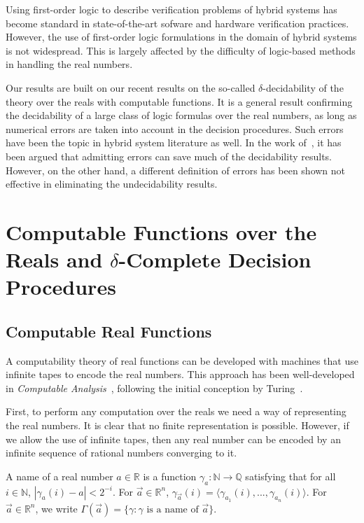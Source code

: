 \documentclass[envcountsect]{llncs}
\begin{document}
Using first-order logic to describe verification problems of hybrid systems has become standard in state-of-the-art sofware and hardware verification practices. However, the use of first-order logic formulations in the domain of hybrid systems is not widespread. This is largely affected by the difficulty of logic-based methods in handling the real numbers. 

Our results are built on our recent results on the so-called $\delta$-decidability of the theory over the reals with computable functions. It is a general result confirming the decidability of a large class of logic formulas over the real numbers, as long as numerical errors are taken into account in the decision procedures. Such errors have been the topic in hybrid system literature as well. In the work of~\cite{}, it has been argued that admitting errors can save much of the decidability results. However, on the other hand, a different definition of errors has been shown not effective in eliminating the undecidability results. 

  


\section{Computable Functions over the Reals and $\delta$-Complete Decision Procedures}

\subsection{Computable Real Functions}

A computability theory of real functions can be developed with machines that use infinite tapes to encode the real numbers. This approach has been well-developed in {\em Computable Analysis}~\cite{CAbook,Kobook,vasco}, following the initial conception by Turing~\cite{}.

First, to perform any computation over the reals we need a way of representing the real numbers. It is clear that no finite representation is possible. However, if we allow the use of infinite tapes, then any real number can be encoded by an infinite sequence of rational numbers converging to it. 
\begin{definition}[Names]
A name of a real number $a\in \mathbb{R}$ is a function $\mathcal{\gamma}_a: \mathbb{N}\rightarrow \mathbb{Q}$ satisfying that for all $i\in \mathbb{N}$, $|\gamma_a(i) - a|<2^{-i}.$ For $\vec a\in \mathbb{R}^n$, $\gamma_{\vec a}(i) = \langle \gamma_{a_1}(i), ..., \gamma_{a_n}(i)\rangle$. For $\vec a\in \mathbb{R}^n$, we write $\Gamma(\vec a) = \{\gamma: \gamma\mbox{ is a name of }\vec a\}$. 
\end{definition}
\end{document}
